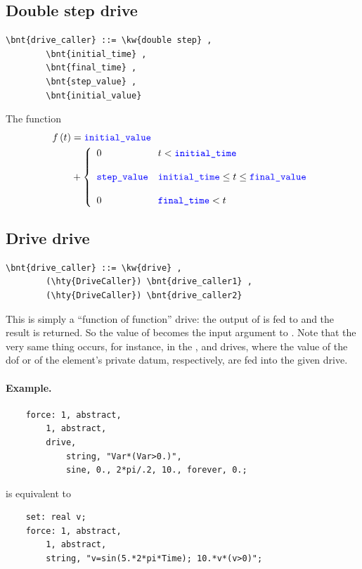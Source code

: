 \subsection{Double step drive}
\begin{Verbatim}[commandchars=\\\{\}]
    \bnt{drive_caller} ::= \kw{double step} ,
        \bnt{initial_time} , 
        \bnt{final_time} ,
        \bnt{step_value} , 
        \bnt{initial_value}
\end{Verbatim}
The function
\begin{align}
	f\plbr{t} &= \nt{initial\_value} \nonumber \\
	&+ \lcubr{\matr{ll}{
		0
			& t < \nt{initial\_time} \\
		\\
		\nt{step\_value}
			& \nt{initial\_time} \le t \le \nt{final\_value} \\
		\\
		0 
			& \nt{final\_time} < t
	}}
\end{align}

\subsection{Drive drive}
\begin{Verbatim}[commandchars=\\\{\}]
    \bnt{drive_caller} ::= \kw{drive} ,
        (\hty{DriveCaller}) \bnt{drive_caller1} , 
        (\hty{DriveCaller}) \bnt{drive_caller2}
\end{Verbatim}
This is simply a ``function of function'' drive: the output 
of  is fed to 
and the result is returned.
So the value of  becomes the input argument
to .
Note that the very same thing occurs, for instance, in the
,  and  drives, where the value of the dof
or of the element's private datum, respectively, are fed 
into the given drive.

\paragraph{Example.}
\begin{verbatim}
    force: 1, abstract,
        1, abstract,
        drive,
            string, "Var*(Var>0.)",
            sine, 0., 2*pi/.2, 10., forever, 0.;
\end{verbatim}
is equivalent to
\begin{verbatim}
    set: real v;
    force: 1, abstract,
        1, abstract,
        string, "v=sin(5.*2*pi*Time); 10.*v*(v>0)";
\end{verbatim}

